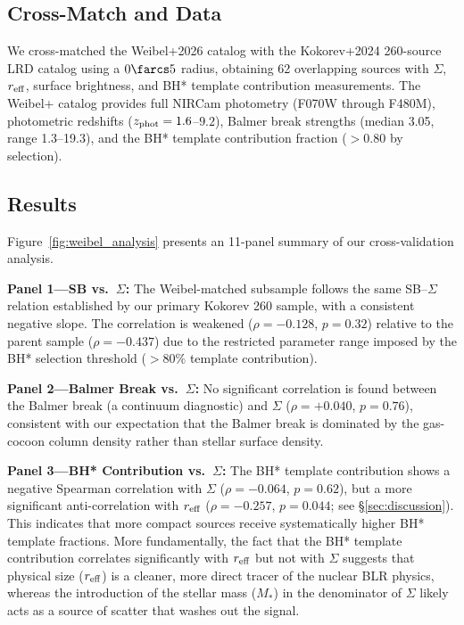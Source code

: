 \documentclass[twocolumn,linenumbers]{aastex631}
\begin{document}
\subsection{Cross-Match and Data}

We cross-matched the Weibel+2026 catalog with the Kokorev+2024 260-source LRD catalog using a $0\farcs5$ radius, obtaining 62 overlapping sources with $\Sigma$, $r_{\rm eff}$, surface brightness, and BH* template contribution measurements. The Weibel+ catalog provides full NIRCam photometry (F070W through F480M), photometric redshifts ($z_{\rm phot} = 1.6$--$9.2$), Balmer break strengths (median 3.05, range 1.3--19.3), and the BH* template contribution fraction ($>0.80$ by selection).

\subsection{Results}

Figure~\ref{fig:weibel_analysis} presents an 11-panel summary of our cross-validation analysis.

\textbf{Panel 1---SB vs.\ $\Sigma$:} The Weibel-matched subsample follows the same SB--$\Sigma$ relation established by our primary Kokorev 260 sample, with a consistent negative slope. The correlation is weakened ($\rho = -0.128$, $p = 0.32$) relative to the parent sample ($\rho = -0.437$) due to the restricted parameter range imposed by the BH* selection threshold ($>80\%$ template contribution).

\textbf{Panel 2---Balmer Break vs.\ $\Sigma$:} No significant correlation is found between the Balmer break (a continuum diagnostic) and $\Sigma$ ($\rho = +0.040$, $p = 0.76$), consistent with our expectation that the Balmer break is dominated by the gas-cocoon column density rather than stellar surface density.

\textbf{Panel 3---BH* Contribution vs.\ $\Sigma$:} The BH* template contribution shows a negative Spearman correlation with $\Sigma$ ($\rho = -0.064$, $p = 0.62$), but a more significant anti-correlation with $r_{\rm eff}$ ($\rho = -0.257$, $p = 0.044$; see \S\ref{sec:discussion}). This indicates that more compact sources receive systematically higher BH* template fractions. More fundamentally, the fact that the BH* template contribution correlates significantly with $r_{\rm eff}$ but not with $\Sigma$ suggests that physical size ($r_{\rm eff}$) is a cleaner, more direct tracer of the nuclear BLR physics, whereas the introduction of the stellar mass ($M_*$) in the denominator of $\Sigma$ likely acts as a source of scatter that washes out the signal.
\end{document}
